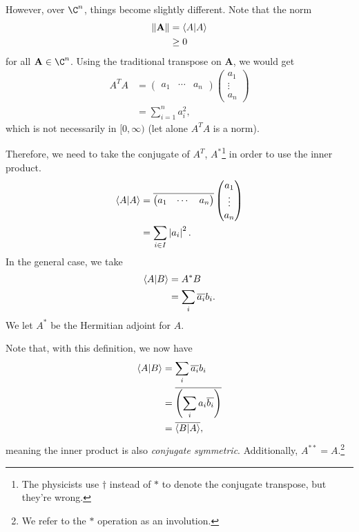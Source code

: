 \documentclass[10pt]{mypackage}
\begin{document}
However, over $\C^n$, things become slightly different. Note that the norm
\begin{align*}
  \norm{\mathbf{A}} &= \braket{A}{A}\\
                    &\geq 0
\end{align*}
for all $\mathbf{A}\in \C^n$. Using the traditional transpose on $\mathbf{A}$, we would get
\begin{align*}
  A^{T}A &= \begin{pmatrix}a_1 & \cdots & a_n\end{pmatrix} \begin{pmatrix}a_1 \\ \vdots \\ a_n\end{pmatrix}\\
         &= \sum_{i=1}^{n}a_i^2,
\end{align*}
which is not necessarily in $[0,\infty)$ (let alone $A^{T}A$ is a norm).\newline

Therefore, we need to take the conjugate of $A^{T}$, $A^{\ast}$\footnote{The physicists use $\dag$ instead of $\ast$ to denote the conjugate transpose, but they're wrong.} in order to use the inner product.
\begin{align*}
  \braket{A}{A} &= \overline{\begin{pmatrix}a_1 & \cdots & a_n\end{pmatrix}} \begin{pmatrix}a_1\\\vdots\\a_n\end{pmatrix}\\
                &= \sum_{i\in I}\left\vert a_i \right\vert^2.
\end{align*}
In the general case, we take
\begin{align*}
  \braket{A}{B} &= A^{\ast}B\\
                &= \sum_{i}\overline{a_i}b_i.
\end{align*}
We let $A^{\ast}$ be the Hermitian adjoint for $A$.\newline

Note that, with this definition, we now have
\begin{align*}
  \braket{A}{B} &= \sum_{i}\overline{a_i}b_i\\
                &= \overline{\left(\sum_{i}a_i\overline{b_i}\right)}\\
                &= \overline{\braket{B}{A}},
\end{align*}
meaning the inner product is also \textit{conjugate symmetric}. Additionally, $A^{\ast\ast} = A$.\footnote{We refer to the $\ast$ operation as an involution.}\newline
\end{document}
